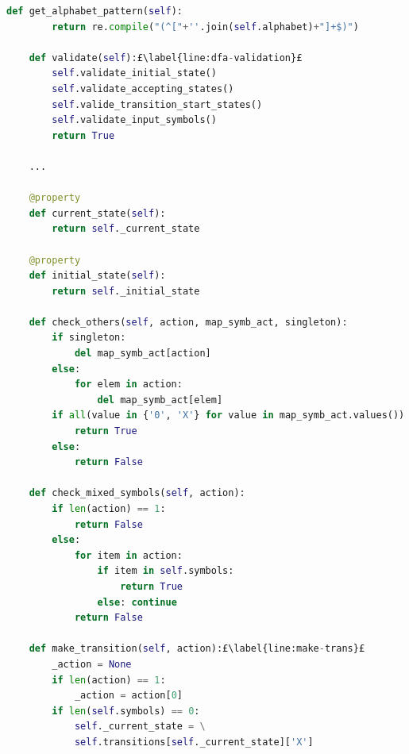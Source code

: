 \begin{lstlisting}[language=Python, style=Python, escapechar = £, label={code:janus-automa}, caption={The \texttt{automa.py} module}]
    def get_alphabet_pattern(self):
        return re.compile("(^["+''.join(self.alphabet)+"]+$)")

    def validate(self):£\label{line:dfa-validation}£
        self.validate_initial_state()
        self.validate_accepting_states()
        self.valide_transition_start_states()
        self.validate_input_symbols()
        return True

    ...

    @property
    def current_state(self):
        return self._current_state

    @property
    def initial_state(self):
        return self._initial_state
        
    def check_others(self, action, map_symb_act, singleton):
        if singleton:
            del map_symb_act[action]
        else:
            for elem in action:
                del map_symb_act[elem]
        if all(value in {'0', 'X'} for value in map_symb_act.values()):
            return True
        else:
            return False

    def check_mixed_symbols(self, action):
        if len(action) == 1:
            return False
        else:
            for item in action:
                if item in self.symbols:
                    return True
                else: continue
            return False

    def make_transition(self, action):£\label{line:make-trans}£
        _action = None
        if len(action) == 1:
            _action = action[0]
        if len(self.symbols) == 0:
            self._current_state = \
            self.transitions[self._current_state]['X']


\end{lstlisting}
